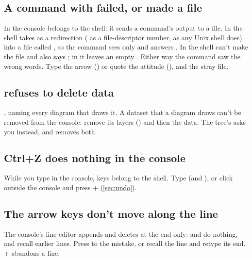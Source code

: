 
\subsection{A command with \code{>} failed, or made a file}

In the console \code{>} belongs to the shell: it sends a command's output to a file. In  the shell takes  as a redirection ( as a file-descriptor number,
as any Unix shell does) into a file called , so the command sees only  and
answers . In  the shell can't make the file and
also says ; in  it leaves an empty
. Either way the command saw the wrong words. Type the arrow () or quote the
attitude (), and  the stray file.

\subsection{ refuses to delete data}

,
naming every diagram that draws it. A dataset that a diagram draws can't be removed from the console:
remove its layers () and then the data. The tree's
 asks you instead, and removes both.

\subsection{Ctrl+Z does nothing in the console}

While you type in the console, keys belong to the shell. Type  (and ), or click
outside the console and press + (\cref{sec:undo}).

\subsection{The arrow keys don't move along the line}

The console's line editor appends and deletes at the end only:  and  do nothing, and
  recall earlier lines. Press  to the mistake, or recall the line and retype
its end. + abandons a line.

